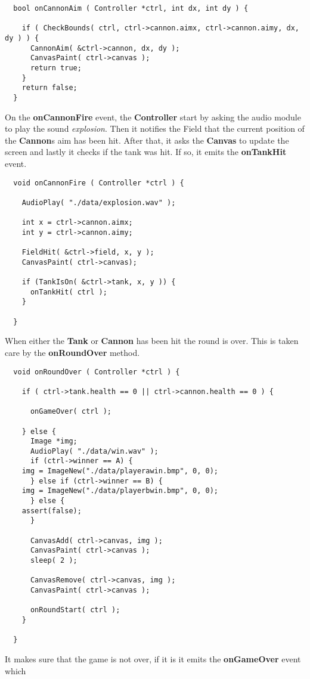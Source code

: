 \begin{lstlisting}
  bool onCannonAim ( Controller *ctrl, int dx, int dy ) {

    if ( CheckBounds( ctrl, ctrl->cannon.aimx, ctrl->cannon.aimy, dx, dy ) ) {
      CannonAim( &ctrl->cannon, dx, dy );
      CanvasPaint( ctrl->canvas );
      return true;
    }
    return false;
  }
\end{lstlisting}
On the {\bf onCannonFire} event, the {\bf Controller} start by asking the audio module to play the
sound {\it explosion}. Then it notifies the Field that the current position of the {\bf Cannon}s aim
has been hit. After that, it asks the {\bf Canvas} to update the screen and lastly it checks if the
tank was hit. If so, it emits the {\bf onTankHit} event.
\begin{lstlisting}
  void onCannonFire ( Controller *ctrl ) {

    AudioPlay( "./data/explosion.wav" );

    int x = ctrl->cannon.aimx;
    int y = ctrl->cannon.aimy;

    FieldHit( &ctrl->field, x, y );
    CanvasPaint( ctrl->canvas);

    if (TankIsOn( &ctrl->tank, x, y )) {
      onTankHit( ctrl );
    }

  }
\end{lstlisting}
When either the {\bf Tank} or {\bf Cannon} has been hit the round is over. This is
taken care by the {\bf onRoundOver} method.
\begin{lstlisting}
  void onRoundOver ( Controller *ctrl ) {

    if ( ctrl->tank.health == 0 || ctrl->cannon.health == 0 ) {

      onGameOver( ctrl );

    } else {
      Image *img;
      AudioPlay( "./data/win.wav" );
      if (ctrl->winner == A) {
	img = ImageNew("./data/playerawin.bmp", 0, 0);
      } else if (ctrl->winner == B) {
	img = ImageNew("./data/playerbwin.bmp", 0, 0);
      } else {
	assert(false);
      }

      CanvasAdd( ctrl->canvas, img );
      CanvasPaint( ctrl->canvas );
      sleep( 2 );

      CanvasRemove( ctrl->canvas, img );
      CanvasPaint( ctrl->canvas );

      onRoundStart( ctrl );
    }

  }
\end{lstlisting}
It makes sure that the game is not over, if it is it emits the {\bf onGameOver} event which
